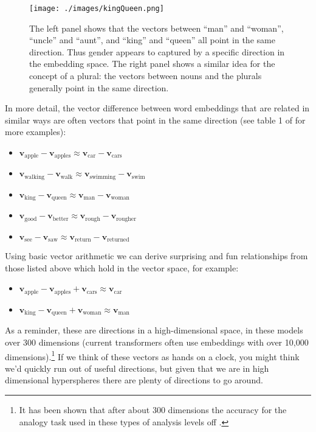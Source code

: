 \begin{figure}[h]
\centering
\texttt{[image: ./images/kingQueen.png]}
\caption[From \cite{mikolov2013linguistic}.]{The left panel shows that the vectors between ``man'' and ``woman'', ``uncle'' and ``aunt'', and ``king'' and ``queen'' all point in the same direction. Thus gender appears to captured by a specific direction in the embedding space. The right panel shows a similar idea for the concept of a plural: the vectors between nouns and the plurals generally point in the same direction.}
\label{geometryWordEmbedding}
\end{figure}

In more detail, the vector difference between word embeddings that are related in similar ways are often vectors that point in the same direction (see table 1 of \cite{mikolov2013linguistic} for more examples):

\begin{itemize}
  \item $\textbf{v}_\text{apple} - \textbf{v}_\text{apples} \approx \textbf{v}_\text{car} - \textbf{v}_\text{cars}$
  \item $\textbf{v}_\text{walking} - \textbf{v}_\text{walk} \approx \textbf{v}_\text{swimming} - \textbf{v}_\text{swim}$
  \item $\textbf{v}_\text{king} - \textbf{v}_\text{queen} \approx \textbf{v}_\text{man} - \textbf{v}_\text{woman}$
  \item $\textbf{v}_\text{good} - \textbf{v}_\text{better} \approx \textbf{v}_\text{rough} - \textbf{v}_\text{rougher}$
  \item $\textbf{v}_\text{see} - \textbf{v}_\text{saw} \approx \textbf{v}_\text{return} - \textbf{v}_\text{returned}$
\end{itemize}

Using basic vector arithmetic we can derive surprising and fun relationships from those listed above which hold in the vector space, for example:

\begin{itemize}
  \item $\textbf{v}_\text{apple} - \textbf{v}_\text{apples} + \textbf{v}_\text{cars} \approx \textbf{v}_\text{car} $
  \item $\textbf{v}_\text{king} - \textbf{v}_\text{queen} + \textbf{v}_\text{woman} \approx  \textbf{v}_\text{man}$
\end{itemize}

As a reminder, these are directions in a high-dimensional space, in these models over 300 dimensions (current transformers often use embeddings with over 10,000 dimensions).\footnote{It has been shown that after about 300 dimensions the accuracy for the analogy task used in these types of analysis levels off \cite{pennington2014glove}.}  If we think of these vectors as hands on a clock, you might think we'd quickly run out of useful directions, but given that we are in high dimensional hyperspheres there are plenty of directions to go around.


